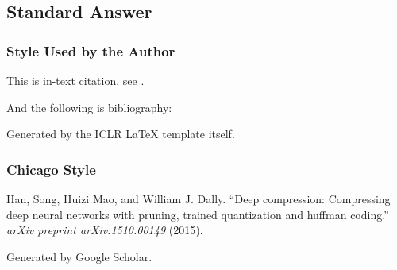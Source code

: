 \documentclass{article} %
\begin{document}
\subsection{Standard Answer}

\subsubsection{Style Used by the Author}

This is in-text citation, see \citet{han2015deep}.

And the following is bibliography:




Generated by the ICLR \LaTeX{} template itself.

\subsubsection{Chicago Style}

Han, Song, Huizi Mao, and William J. Dally. ``Deep compression: Compressing deep 
neural networks with pruning, trained quantization and huffman coding.'' \emph{arXiv 
preprint arXiv:1510.00149} (2015).

Generated by Google Scholar.
\end{document}
